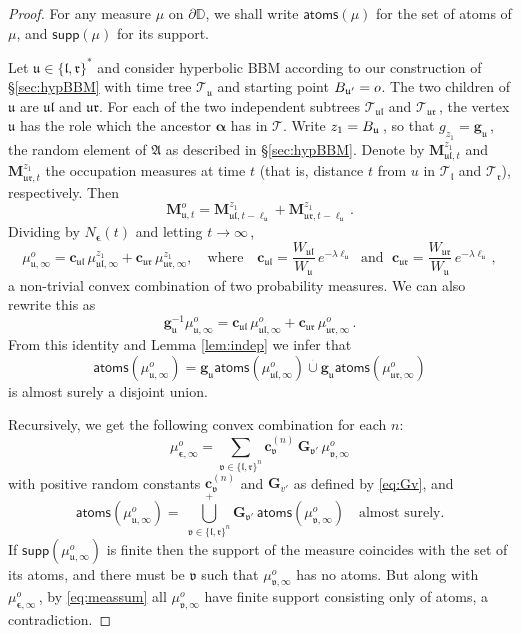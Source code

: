 \documentclass[12pt]{amsart}
\newcommand\Aff{\mathfrak A}
\newcommand\bal{\boldsymbol{\alpha}}
\newcommand\bep{\boldsymbol{\epsilon}}
\newcommand\BB{\textit{\textbf{B}}}
\newcommand\cb{\mathbf{c}}
\newcommand\DD{\mathbb D}
\newcommand\gb{\mathbf{g}}
\newcommand\Gb{\mathbf{G}}
\newcommand\lt{\mathfrak{l}}
\newcommand\Mbf{\mathbf M}
\newcommand\nn{N}
\newcommand\rt{\mathfrak{r}}
\newcommand\T{\mathcal T}
\newcommand\ut{\mathfrak{u}}
\newcommand\vt{\mathfrak{v}}
\numberwithin{theorem}{section}
\theoremstyle{definition}
\begin{document}
\begin{proof} For any measure $\mu$ on $\partial \DD$, we shall write 
$\mathsf{atoms}(\mu)$ for the set of atoms of  $\mu$, and $\mathsf{supp}(\mu)$
for its support.

Let $\ut \in  \{\lt,\rt\}^*$ and consider hyperbolic BBM according to our construction
of \S \ref{sec:hypBBM} with time tree $\T_{\ut}$ and starting point $\BB_{\ut'} = o$. 
The two children of $\ut$ are $\ut\lt$ and $\ut\rt$. For each of the 
two independent subtrees $\T_{\ut\lt}$ and $\T_{\ut\rt}\,$, the vertex
$\ut$ has the role which the ancestor $\bal$ has in $\T$. Write 
$z_1 = \BB_{\ut}\,$, so that $g_{z_1} = \gb_{\ut}\,$, the random element
of $\Aff$ as described in \S \ref{sec:hypBBM}.
Denote by $\Mbf_{\ut\lt,t}^{z_1}$ and $\Mbf_{\ut\rt,t}^{z_1}$ the occupation measures
at time $t$ (that is, distance $t$ from $u$ in $\T_{\lt}$ and $\T_{\rt}$),
respectively. 
Then
$$
\Mbf_{\ut,t}^o = \Mbf_{\ut\lt,t-\ell_{\ut}}^{z_1} + \Mbf_{\ut\rt,t-\ell_{\ut}}^{z_1}\,.
$$
Dividing by $\nn_{\bep}(t)$ and letting $t \to \infty\,$,
$$
\mu_{\ut,\infty}^o 
= \cb_{\ut\lt} \,\mu_{\ut\lt,\infty}^{z_1}
+ \cb_{\ut\rt}\,\mu_{\ut\rt,\infty}^{z_1},
\quad \text{where}\quad \cb_{\ut\lt} = \frac{W_{\ut\lt}}{W_{\ut}} \, e^{-\lambda\ell_{\ut}}
\;\text{ and }\; \cb_{\ut\rt} = \frac{W_{\ut\rt}}{W_{\ut}} \, e^{-\lambda\ell_{\ut}}\,,
$$
a non-trivial convex combination of two probability measures. 
We can also rewrite this as
$$
\gb_{\ut}^{-1}\mu_{\ut,\infty}^o 
= \cb_{\ut\lt} \,\mu_{\ut\lt,\infty}^{o}
+ \cb_{\ut\rt}\,\mu_{\ut\rt,\infty}^{o}\,.
$$
From this identity and Lemma \ref{lem:indep} we infer that
$$
\mathsf{atoms}(\mu_{\ut,\infty}^o) 
= \gb_{\ut}\mathsf{atoms}(\mu_{\ut\lt,\infty}^o)  \stackrel{{\,}_{_{_{_+}}}}{\cup} 
\gb_{\ut}\mathsf{atoms}(\mu_{\ut\rt,\infty}^o)
$$
is almost surely a disjoint union. 

Recursively, we get the following convex combination for each $n$:
\begin{equation}\label{eq:meassum}
\mu_{\bep,\infty}^o = 
\sum_{\vt \in \{\lt,\rt\}^n} \cb^{(n)}_{\vt}\, \Gb_{\vt'}\, \mu_{\vt,\infty}^o
\end{equation}
with positive random constants $\cb^{(n)}_{\vt}$ and $\Gb_{v'}$ as defined by \eqref{eq:Gv}, and 
$$
\mathsf{atoms}(\mu_{\ut,\infty}^o) = %
\ {\bigcup}_{\vt \in \{\lt,\rt\}^n}^{\!\!\!\!\!\!\!+}
\Gb_{\vt'}\, \mathsf{atoms}(\mu_{\vt,\infty}^o) \quad \text{almost surely.}
$$
If $\mathsf{supp}(\mu_{\ut,\infty}^o)$ is finite then the support of the measure coincides with
the set of its atoms, and there must be $\vt$ such that $\mu_{\vt,\infty}^o$ has no atoms.
But along with $\mu_{\bep,\infty}^o\,$, by \eqref{eq:meassum} all $\mu_{\vt,\infty}^o$
have finite support consisting only of atoms, a contradiction.
\end{proof}
\end{document}
